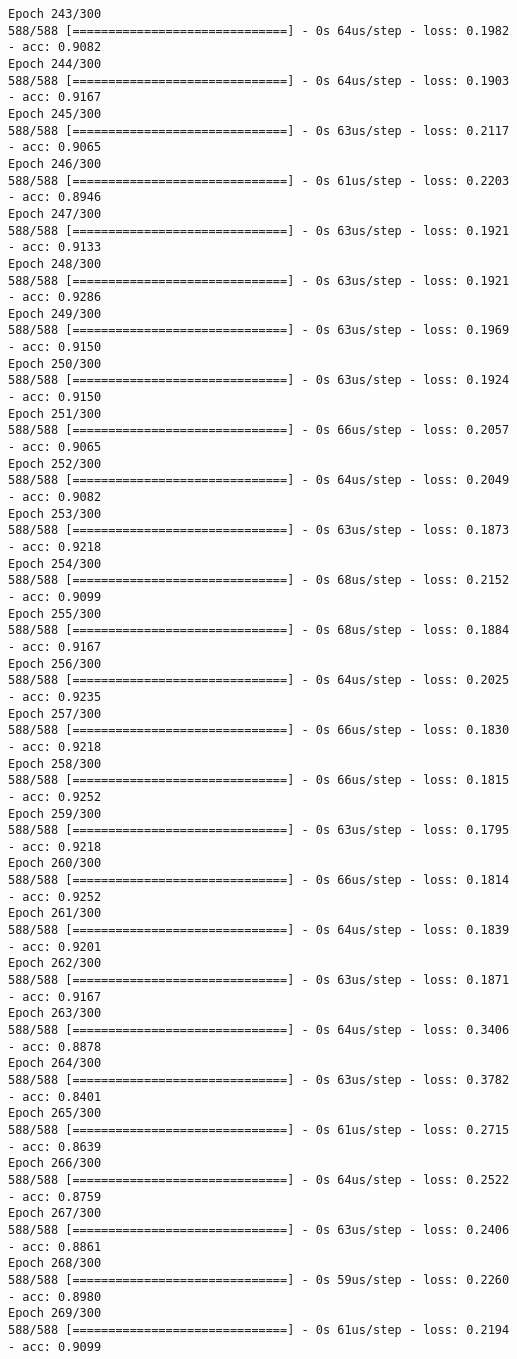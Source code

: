 \documentclass[11pt]{article}
\begin{document}
\begin{Verbatim}[commandchars=\\\{\}]
Epoch 243/300
588/588 [==============================] - 0s 64us/step - loss: 0.1982 - acc: 0.9082
Epoch 244/300
588/588 [==============================] - 0s 64us/step - loss: 0.1903 - acc: 0.9167
Epoch 245/300
588/588 [==============================] - 0s 63us/step - loss: 0.2117 - acc: 0.9065
Epoch 246/300
588/588 [==============================] - 0s 61us/step - loss: 0.2203 - acc: 0.8946
Epoch 247/300
588/588 [==============================] - 0s 63us/step - loss: 0.1921 - acc: 0.9133
Epoch 248/300
588/588 [==============================] - 0s 63us/step - loss: 0.1921 - acc: 0.9286
Epoch 249/300
588/588 [==============================] - 0s 63us/step - loss: 0.1969 - acc: 0.9150
Epoch 250/300
588/588 [==============================] - 0s 63us/step - loss: 0.1924 - acc: 0.9150
Epoch 251/300
588/588 [==============================] - 0s 66us/step - loss: 0.2057 - acc: 0.9065
Epoch 252/300
588/588 [==============================] - 0s 64us/step - loss: 0.2049 - acc: 0.9082
Epoch 253/300
588/588 [==============================] - 0s 63us/step - loss: 0.1873 - acc: 0.9218
Epoch 254/300
588/588 [==============================] - 0s 68us/step - loss: 0.2152 - acc: 0.9099
Epoch 255/300
588/588 [==============================] - 0s 68us/step - loss: 0.1884 - acc: 0.9167
Epoch 256/300
588/588 [==============================] - 0s 64us/step - loss: 0.2025 - acc: 0.9235
Epoch 257/300
588/588 [==============================] - 0s 66us/step - loss: 0.1830 - acc: 0.9218
Epoch 258/300
588/588 [==============================] - 0s 66us/step - loss: 0.1815 - acc: 0.9252
Epoch 259/300
588/588 [==============================] - 0s 63us/step - loss: 0.1795 - acc: 0.9218
Epoch 260/300
588/588 [==============================] - 0s 66us/step - loss: 0.1814 - acc: 0.9252
Epoch 261/300
588/588 [==============================] - 0s 64us/step - loss: 0.1839 - acc: 0.9201
Epoch 262/300
588/588 [==============================] - 0s 63us/step - loss: 0.1871 - acc: 0.9167
Epoch 263/300
588/588 [==============================] - 0s 64us/step - loss: 0.3406 - acc: 0.8878
Epoch 264/300
588/588 [==============================] - 0s 63us/step - loss: 0.3782 - acc: 0.8401
Epoch 265/300
588/588 [==============================] - 0s 61us/step - loss: 0.2715 - acc: 0.8639
Epoch 266/300
588/588 [==============================] - 0s 64us/step - loss: 0.2522 - acc: 0.8759
Epoch 267/300
588/588 [==============================] - 0s 63us/step - loss: 0.2406 - acc: 0.8861
Epoch 268/300
588/588 [==============================] - 0s 59us/step - loss: 0.2260 - acc: 0.8980
Epoch 269/300
588/588 [==============================] - 0s 61us/step - loss: 0.2194 - acc: 0.9099

\end{Verbatim}
\end{document}

